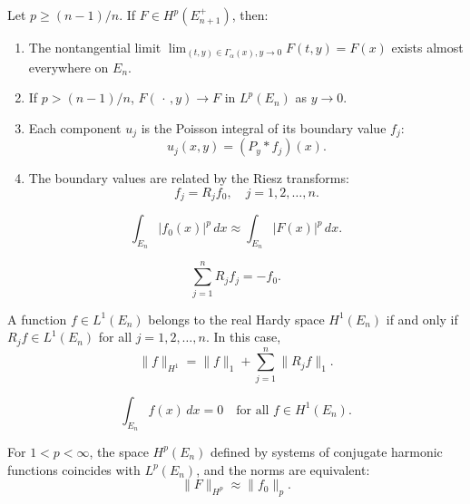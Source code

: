 \begin{theorem}\label{thm:c6-4-9}
Let $p \geq (n-1)/n$. If $F \in H^p(E_{n+1}^+)$, then:
\begin{enumerate}
\item[(a)] The nontangential limit $\lim_{(t,y) \in \Gamma_\alpha(x), y \to 0} F(t, y) = F(x)$ exists almost everywhere on $E_n$.
\item[(b)] If $p > (n-1)/n$, $F(\,\cdot\,, y) \to F$ in $L^p(E_n)$ as $y \to 0$.
\item[(c)] Each component $u_j$ is the Poisson integral of its boundary value $f_j$:
\begin{equation}\label{eq:c6-4-10}
u_j(x, y) = (P_y * f_j)(x).
\end{equation}
\item[(d)] The boundary values are related by the Riesz transforms:
\begin{equation}\label{eq:c6-4-11}
f_j = R_j f_0, \quad j = 1, 2, \dots, n.
\end{equation}
\end{enumerate}
\end{theorem}

\begin{equation}\label{eq:c6-4-12}
\int_{E_n} |f_0(x)|^p\,dx \approx \int_{E_n} |F(x)|^p\,dx.
\end{equation}

\begin{equation}\label{eq:c6-4-13}
\sum_{j=1}^n R_j f_j = -f_0.
\end{equation}

\begin{theorem}[Characterization of $H^1(E_n)$]\label{thm:c6-4-14}
A function $f \in L^1(E_n)$ belongs to the real Hardy space $H^1(E_n)$ if and only if $R_j f \in L^1(E_n)$ for all $j = 1, 2, \dots, n$. In this case,
\begin{equation}\label{eq:c6-4-15}
\|f\|_{H^1} = \|f\|_1 + \sum_{j=1}^n \|R_j f\|_1.
\end{equation}
\end{theorem}

\begin{equation}\label{eq:c6-4-16}
\int_{E_n} f(x)\,dx = 0 \quad \text{for all } f \in H^1(E_n).
\end{equation}

\begin{theorem}\label{thm:c6-4-17}
For $1 < p < \infty$, the space $H^p(E_n)$ defined by systems of conjugate harmonic functions coincides with $L^p(E_n)$, and the norms are equivalent:
\[
\|F\|_{H^p} \approx \|f_0\|_p.
\]
\end{theorem}

